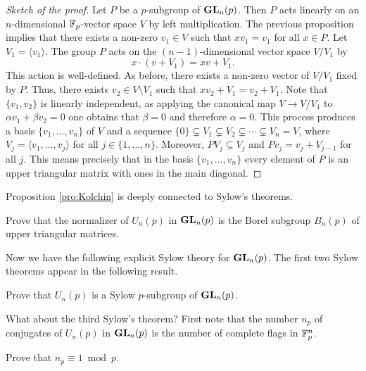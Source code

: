 \begin{proof}[Sketch of the proof]
    Let $P$ be a $p$-subgroup of $\mathbf{GL}_n(p)$. 
    Then $P$ acts linearly on an $n$-dimensional 
    $\mathbb{F}_p$-vector space $V$ by left multiplication. 
    The previous
    proposition implies that there exists a non-zero
    $v_1\in V$
    such that $xv_1=v_1$ for all $x\in P$. Let 
    $V_1=\langle v_1\rangle$. The group $P$ 
    acts on the $(n-1)$-dimensional vector space 
    $V/V_1$ by 
    \[
    x\cdot (v+V_1)=xv+V_1.
    \]
    This action is well-defined. 
    As before, there exists a non-zero 
    vector of $V/V_1$ fixed by $P$. Thus, 
    there exists $v_2\in V\setminus V_1$ such that 
    $xv_2+V_1=v_2+V_1$. Note that $\{v_1,v_2\}$ is linearly
    independent, as applying the canonical
    map $V\to V/V_1$ to 
    $\alpha v_1+\beta v_2=0$ one obtains
    that $\beta=0$ and therefore $\alpha=0$. This process
    produces a basis $\{v_1,\dots,v_n\}$ 
    of $V$ and a sequence $\{0\}\subsetneq V_1\subsetneq V_2\subsetneq\cdots\subsetneq V_n=V$, where 
    $V_j=\langle v_1,\dots,v_j\rangle$ for all $j\in\{1,\dots,n\}$. Moreover,  
    $PV_j\subseteq V_j$  and 
    $Pv_j=v_j+V_{j-1}$ for all $j$. This
    means precisely that in the basis 
    $\{v_1,\dots,v_n\}$ 
    every element of $P$ is an upper triangular
    matrix with ones in the main diagonal. 
\end{proof}

Proposition \ref{pro:Kolchin} is deeply 
connected to Sylow's theorems. 

\begin{exercise}
    Prove that the normalizer of $U_n(p)$ in $\mathbf{GL}_n(p)$ is the
    Borel subgroup $B_n(p)$ of upper triangular matrices. 
\end{exercise}

Now we have the following explicit Sylow theory for
$\mathbf{GL}_n(p)$. The first two Sylow theorems 
appear in the following result. 

\begin{exercise}
    Prove that  $U_n(p)$ is a Sylow $p$-subgroup of $\mathbf{GL}_n(p)$. 
\end{exercise}

What about the third Sylow's theorem? 
First note that the number $n_p$
of conjugates of $U_n(p)$ in $\mathbf{GL}_n(p)$ 
is the number of complete flags 
in $\mathbb{F}_p^n$.

\begin{exercise}
    Prove that $n_p\equiv1\bmod p$. 
\end{exercise}

